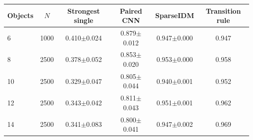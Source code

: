 \begin{tabular}{lccccc}
\toprule
Objects & $N$ & Strongest single & Paired CNN & SparseIDM & Transition rule \\
\midrule
6 & 1000 & 0.410$\pm$0.024 & 0.879$\pm$0.012 & 0.947$\pm$0.000 & 0.947 \\
8 & 2500 & 0.378$\pm$0.052 & 0.853$\pm$0.020 & 0.953$\pm$0.000 & 0.958 \\
10 & 2500 & 0.329$\pm$0.047 & 0.805$\pm$0.044 & 0.940$\pm$0.001 & 0.952 \\
12 & 2500 & 0.343$\pm$0.042 & 0.811$\pm$0.043 & 0.951$\pm$0.001 & 0.962 \\
14 & 2500 & 0.341$\pm$0.083 & 0.800$\pm$0.041 & 0.947$\pm$0.002 & 0.969 \\
\bottomrule
\end{tabular}
